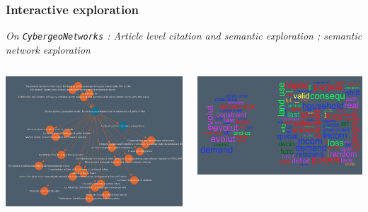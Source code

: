 \begin{frame}
\frametitle{Interactive exploration}
\textit{On \texttt{CybergeoNetworks} : Article level citation and semantic exploration ; semantic network exploration}

\bigskip
\bigskip


\begin{columns}
\begin{column}{0.45\textwidth}
\includegraphics[width=\textwidth]{figures/ex_citvisu_23337}
\end{column}
\begin{column}{0.55\textwidth}
\includegraphics[width=\textwidth]{figures/ex_visuwordcloud_25892}
\end{column}
\end{columns}

\end{frame}




